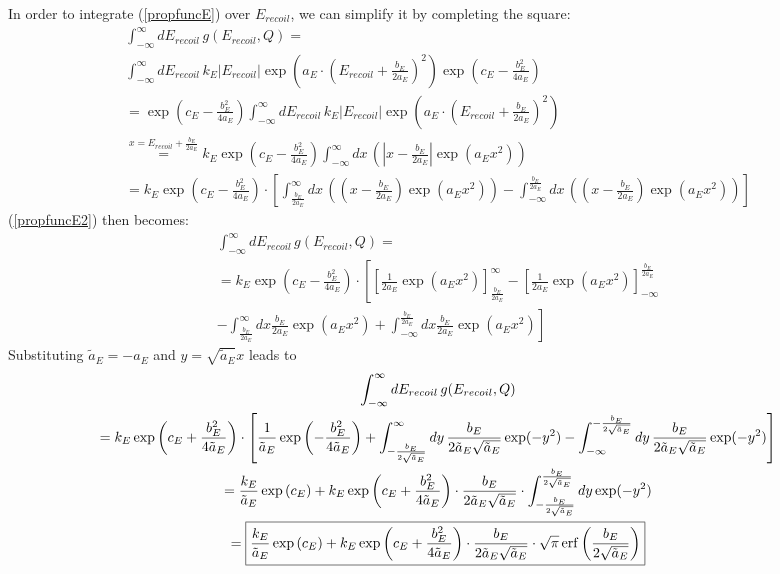 In order to integrate (\ref{propfuncE}) over $E_{recoil}$, we can simplify it 
by completing the square:
\begin{gather}
\int_{-\infty}^{\infty} dE_{recoil} \, g(E_{recoil},Q) = \\
\int_{-\infty}^{\infty} dE_{recoil} \, k_E \left| E_{recoil} \right| 
\exp \left( a_E \cdot \left( E_{recoil} + \frac{b_E}{2 a_E} \right)^2 \right)
\exp \left( c_E - \frac{b_E^2}{4 a_E} \right) \\
= \exp \left( c_E - \frac{b_E^2}{4 a_E} \right)
\int_{-\infty}^{\infty} dE_{recoil} \, k_E \left| E_{recoil} \right| 
\exp \left( a_E \cdot \left(E_{recoil} + \frac{b_E}{2 a_E} \right)^2 \right) \\
\overset{x = E_{recoil} + \frac{b_E}{2 a_E}}{=} k_E
\exp \left( c_E - \frac{b_E^2}{4 a_E} \right)
 \int_{-\infty}^{\infty} dx \, \left(
\left| x - \frac{b_E}{2 a_E} \right| \exp \left( a_E x^2 \right) \right) \\
= k_E \exp \left( c_E - \frac{b_E^2}{4 a_E} \right) \cdot
\left[ \int_{\frac{b_E}{2 a_E}}^\infty dx \, \left(
\left( x - \frac{b_E}{2 a_E} \right) \exp \left( a_E x^2 \right) \right)
- \int_{-\infty}^{\frac{b_E}{2 a_E}} dx \,  \left(
\left( x - \frac{b_E}{2 a_E} \right) \exp \left( a_E x^2 \right) \right) \right]
\label{propfuncE2}
\end{gather}
(\ref{propfuncE2}) then becomes:
\begin{gather}
\int_{-\infty}^{\infty} dE_{recoil} \, g(E_{recoil},Q) = \\
= k_E \exp \left( c_E - \frac{b_E^2}{4 a_E} \right) \cdot \left[ 
\left[ \frac{1}{2 a_E} \exp (a_E x^2) \right]_{\frac{b_E}{2 a_E}}^{\infty} -
\left[ \frac{1}{2 a_E} \exp (a_E x^2) \right]_{-\infty}^{\frac{b_E}{2 a_E}} \right. \\
\left. - \int_{\frac{b_E}{2 a_E}}^{\infty} dx \frac{b_E}{2 a_E} \exp ( a_E x^2)
+ \int_{-\infty}^{\frac{b_E}{2 a_E}} dx \frac{b_E}{2 a_E} \exp ( a_E x^2) \right] 
\end{gather}
Substituting $\tilde{a}_E = - a_E$ and $ y = \sqrt{\tilde{a}_E} x$ leads to
\begin{gather}
\int_{-\infty}^{\infty} dE_{recoil} \, g(E_{recoil},Q) \\
= k_E \exp \left( c_E + \frac{b_E^2}{4 \tilde{a}_E} \right) \cdot \left[
 \frac{1}{\tilde{a}_E} \exp \left( - \frac{b_E^2}{4 \tilde{a}_E} \right)
+ \int_{- \frac{b_E}{2 \sqrt{\tilde{a}_E}}}^{\infty} dy \, \frac{b_E}{2 \tilde{a}_E
\sqrt{\tilde{a}_E}} \exp ( - y^2)
- \int_{-\infty}^{- \frac{b_E}{2 \sqrt{\tilde{a}_E}}} dy \, 
\frac{b_E}{2 \tilde{a}_E \sqrt{\tilde{a}_E}} \exp ( -y^2) 
\right] \\
= \frac{k_E}{\tilde{a}_E} \exp \left( c_E \right) 
+ k_E \exp \left( c_E + \frac{b_E^2}{4 \tilde{a}_E} \right)
\cdot \frac{b_E}{2 \tilde{a}_E \sqrt{\tilde{a}_E}} \cdot
 \int_{- \frac{b_E}{2 \sqrt{\tilde{a}_E}}}^{\frac{b_E}{2 \sqrt{\tilde{a}_E}}}
dy \exp( - y^2) \\
= \framebox{$\displaystyle \frac{k_E}{\tilde{a}_E} \exp \left( c_E \right) 
+ k_E \exp \left( c_E + \frac{b_E^2}{4 \tilde{a}_E} \right)
\cdot \frac{b_E}{2 \tilde{a}_E \sqrt{\tilde{a}_E}} \cdot \sqrt{\pi}
\operatorname{erf} \left( \frac{b_E}{2 \sqrt{\tilde{a}_E}} \right)$}
\end{gather}

